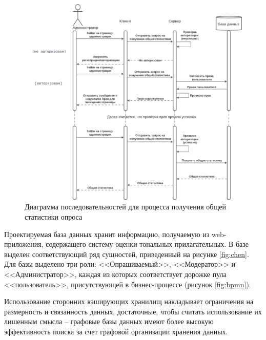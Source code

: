 \begin{center}
	\begin{figure}[H]
		\centering
		\includegraphics[width=\linewidth]{assets/diag-final.png}
		\caption{Диаграмма последовательностей для процесса получения общей статистики опроса}
		\label{fig:diag3}
	\end{figure}
\end{center}

Проектируемая база данных хранит информацию, получаемую из web-приложения, содержащего систему оценки тональных прилагательных. В базе выделен соответствующий ряд сущностей, приведенный на рисунке \ref{fig:chen}. Для базы выделено три роли: <<Опрашиваемый>>, <<Модератор>> и <<Администратор>>, каждая из которых соответствует дорожке пула <<пользователь>>, присутствующей в бизнес-процессе (рисунок \ref{fig:bpmn}). 

Использование сторонних кэширующих хранилищ накладывает ограничения на размерность и связанность данных, достаточные, чтобы считать использование их лишенным смысла -- графовые базы данных имеют более высокую эффективность поиска за счет графовой организации хранения данных.


